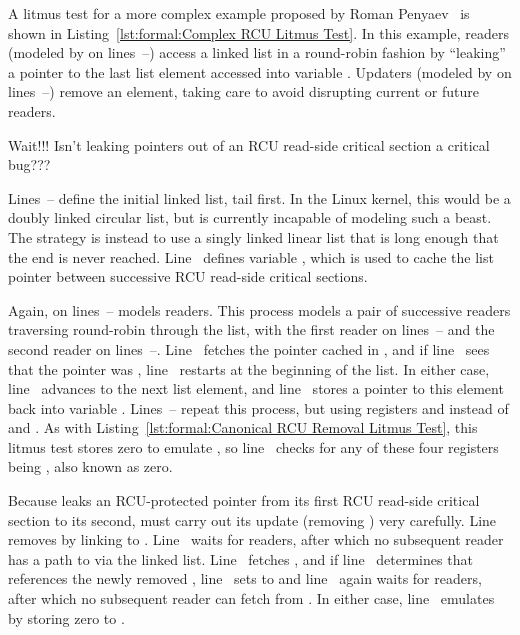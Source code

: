 \begin{lineref}
A litmus test for a more complex example proposed by
Roman Penyaev~\cite{RomanPenyaev2018rrRCU} is shown in
Listing~\ref{lst:formal:Complex RCU Litmus Test}.
In this example, readers (modeled by  on
lines~--) access a linked list
in a round-robin fashion by ``leaking'' a pointer to the last
list element accessed into variable .
Updaters (modeled by  on lines~--)
remove an element, taking care to avoid disrupting current or future
readers.

\QuickQuiz{}
	Wait!!!
	Isn't leaking pointers out of an RCU read-side critical
	section a critical bug???
 \QuickQuizEnd

Lines~-- define the initial linked
list, tail first.
In the Linux kernel, this would be a doubly linked circular list,
but  is currently incapable of modeling such a beast.
The strategy is instead to use a singly linked linear list that
is long enough that the end is never reached.
Line~ defines variable , which is used to
cache the list pointer between successive RCU read-side critical
sections.

Again,  on lines~-- models readers.
This process models a pair of successive readers traversing round-robin
through the list, with the first reader on lines~--
and the second reader on lines~--.
Line~ fetches the pointer cached in , and if
line~ sees that the pointer was ,
line~ restarts at the beginning of the list.
In either case, line~ advances to the next list element,
and line~ stores a pointer to this element back into
variable .
Lines~-- repeat this process, but using
registers  and  instead of  and .
As with
Listing~\ref{lst:formal:Canonical RCU Removal Litmus Test},
this litmus test stores zero to emulate , so
line~ checks for any of these four registers being
, also known as zero.

Because  leaks an RCU-protected pointer from its first
RCU read-side critical section to its second,  must carry
out its update (removing ) very carefully.
Line~ removes  by linking  to .
Line~ waits for readers, after which no subsequent reader
has a path to  via the linked list.
Line~ fetches , and if line~
determines that  references the newly removed ,
line~ sets  to 
and line~ again waits for readers, after which no
subsequent reader can fetch  from .
In either case, line~ emulates  by storing
zero to .


\end{lineref}
